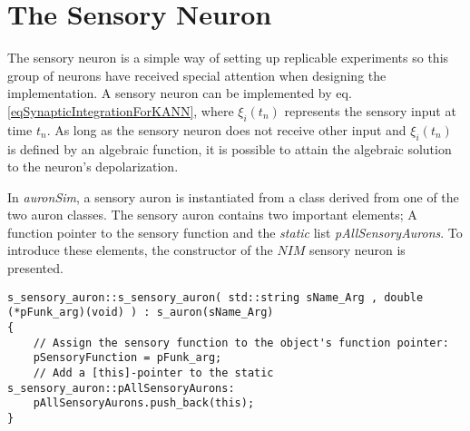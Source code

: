 		\section{The Sensory Neuron} 		%
		\label{appendixSensoryNode}
			The sensory neuron is a simple way of setting up replicable experiments so this group of neurons have received special attention when designing the implementation.
			A sensory neuron can be implemented by eq. \eqref{eqSynapticIntegrationForKANN}, where $\xi_i(t_n)$ represents the sensory input at time $t_n$.
			As long as the sensory neuron does not receive other input and $\xi_i(t_n)$ is defined by an algebraic function, it is possible to attain the algebraic solution to the neuron's depolarization.

			In \emph{auronSim}, a sensory auron is instantiated from a class derived from one of the two auron classes. %
			The sensory auron contains two important elements;
				A function pointer to the sensory function and the \emph{static} list \emph{pAllSensoryAurons}.
			To introduce these elements, the constructor of the $NIM$ sensory neuron is presented.
\begin{lstlisting}
s_sensory_auron::s_sensory_auron( std::string sName_Arg , double (*pFunk_arg)(void) ) : s_auron(sName_Arg)
{
    // Assign the sensory function to the object's function pointer: 
    pSensoryFunction = pFunk_arg;
    // Add a [this]-pointer to the static s_sensory_auron::pAllSensoryAurons:
    pAllSensoryAurons.push_back(this);
}
\end{lstlisting}


